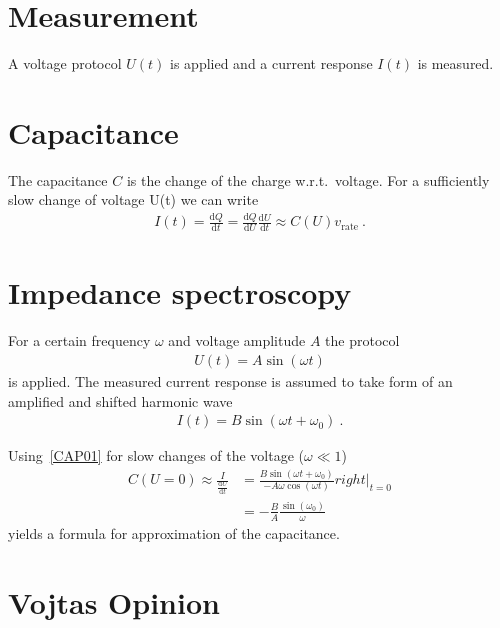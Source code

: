 \documentclass[a4 paper]{article}
\newcommand{\dd}{\mathrm{d}}
\begin{document}
\section{Measurement}
A voltage protocol $U(t)$ is applied and a current response $I(t)$ is measured.
\section{Capacitance}
% 
The capacitance $C$ is the change of the charge w.r.t.\ voltage.
For a sufficiently slow change of voltage U(t) we can write
\begin{align}
    I(t) = \frac{\dd Q}{\dd t} = \frac{\dd Q}{\dd U} \frac{\dd U}{\dd t} \approx C(U) v_{\text{rate}}~.
    \label{CAP01}
\end{align}

\section{Impedance spectroscopy}
For a certain frequency $\omega$ and voltage amplitude $A$ the protocol
\begin{align}
    U(t) = A \sin \left( \omega t \right) 
\end{align}
is applied. The measured current response is assumed to take form of
an amplified and shifted harmonic wave
\begin{align}
    I(t) = B \sin \left( \omega t  + \omega_0 \right) ~.
\end{align}

Using~\eqref{CAP01} for slow changes of the voltage ($\omega \ll 1$)
\begin{align}
    C(U=0) \approx \frac{I}{\frac{\dd U}{\dd t}} 
    &=  \frac{B \sin \left( \omega t+ \omega_0  \right)}
            {-A \omega\cos \left( \omega t  \right)}right|_{ t = 0}\\\
    &= -\frac{B}{A} 
              \frac{\sin \left(\omega_0 \right) }{\omega}   
\end{align}
yields a formula for approximation of the capacitance.

\section{Vojtas Opinion}
\end{document}
